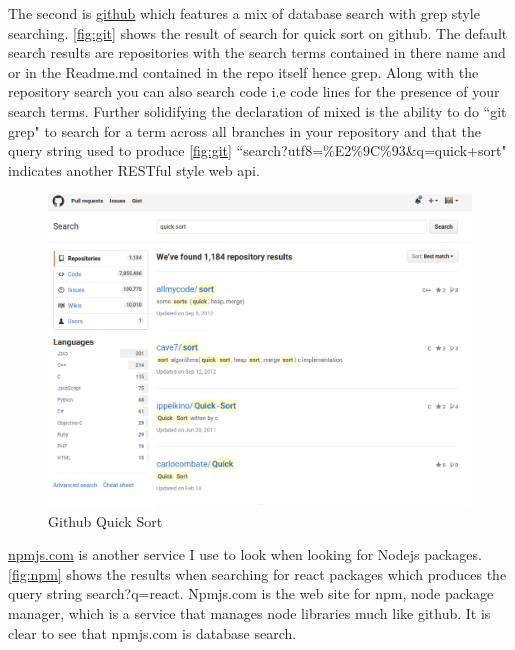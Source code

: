 \documentclass[11pt]{article}
\begin{document}
\noindent
The second is \hyperref[https://github.com]{github} which features a mix of database search with grep style searching. \autoref{fig:git} shows the result of search for quick sort on github. The default search results are repositories with the search terms contained in there name and or in the Readme.md contained in the repo itself hence grep. Along with the repository search you can also search code i.e code lines for the presence of your search terms.  Further solidifying the declaration of mixed is the ability to do ``git grep" to search for a term across all branches in your repository and that the query string used to produce \autoref{fig:git} ``search?utf8=\%E2\%9C\%93\&q=quick+sort" indicates another RESTful style web api.

\begin{figure}[h]
	\centering
	\includegraphics[scale=0.5]{searchStyleGH.png}
	\caption{Github Quick Sort} \label{fig:git}
\end{figure}
\newpage
\noindent
\hyperref[https://www.npmjs.com]{npmjs.com} is another service I use to look when looking for Nodejs packages. \autoref{fig:npm} shows the results when searching for react packages which produces the query string search?q=react. Npmjs.com is the web site for npm, node package manager, which is a service that manages node libraries much like github. It is clear to see that npmjs.com is database search.
\end{document}
